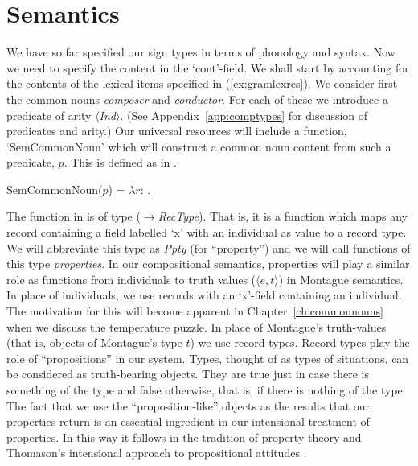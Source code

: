 \section{Semantics}
We have so far specified our sign types in terms of phonology and
syntax.  Now we need to specify the content in the `cont'-field.  We
shall start by accounting for the contents of the lexical items
specified in (\ref{ex:gramlexres}).  We consider first the common
nouns \textit{composer} and \textit{conductor}.  For each of these we
introduce a predicate of arity $\langle$\textit{Ind}$\rangle$.  (See
Appendix~\ref{app:comptypes} for discussion of predicates and
arity.)  Our universal resources will include a function,
`SemCommonNoun' which will construct a common noun content from such a
predicate, $p$.  This is defined as in \nexteg{}.
\begin{ex} 
SemCommonNoun($p$) = $\lambda
r$: .  
\end{ex} 
The function in \preveg{} is of type
($\rightarrow$\textit{RecType}).
That is, it is a function which maps any record containing a field
labelled `x' with an individual as value to a record type.  We will
abbreviate this type as \textit{Ppty} (for ``property'') and we will
call functions of this type \textit{properties}.  In our compositional
semantics, properties will play a similar role as functions from
individuals to truth values ($\langle e,t\rangle$) in Montague
semantics.  In place of individuals, we use records with an `x'-field
containing an individual.  The motivation for this will become
apparent in Chapter~\ref{ch:commonnouns} when we discuss the temperature
puzzle. In place of Montague's truth-values (that is, objects of
Montague's type $t$) we use record types.  Record types play the role
of ``propositions'' in our system.  Types, thought of as types of
situations, can be considered as truth-bearing objects.  They are true
just in case there is something of the type and false otherwise, that
is, if there is
nothing of the type.  The fact that we use the ``proposition-like''
objects as the results that our properties return is an essential
ingredient in our intensional treatment of properties.  In this way it
follows in the tradition of property theory
\citep{ChierchiaTurner1988,FoxLappin2005}  and Thomason's intensional
approach to propositional attitudes \citep{Thomason1980}.

